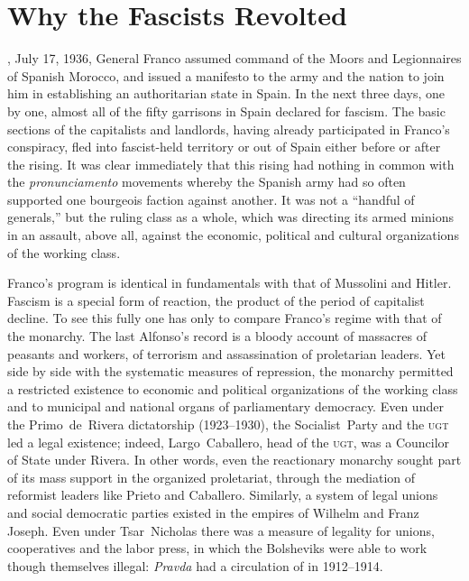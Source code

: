 \chapter{Why the Fascists Revolted}

, July 17, 1936, General Franco{\indexFFranco} assumed command of the Moors and Legionnaires of Spanish Morocco, and issued a manifesto to the army and the nation to join him in establishing an authoritarian state in Spain. In the next three days, one by one, almost all of the fifty garrisons in Spain declared for fascism. The basic sections of the capitalists and landlords, having already participated in Franco’s conspiracy, fled into fascist-held territory or out of Spain either before or after the rising. It was clear immediately that this rising had nothing in common with the \emph{pronunciamento} movements whereby the Spanish army had so often supported one bourgeois faction against another. It was not a ``handful of generals,'' but the ruling class as a whole, which was directing its armed minions in an assault, above all, against the economic, political and cultural organizations of the working class.

\indexFFranco{}
Franco’s program is identical in fundamentals with that of Mussolini and Hitler. Fascism is a special form of reaction, the product of the period of capitalist decline. To see this fully one has only to compare Franco’s regime with that of the monarchy. The last Alfonso’s record is a bloody account of massacres of peasants and workers, of terrorism and assassination of proletarian leaders. Yet side by side with the systematic measures of repression, the monarchy permitted a restricted existence to economic and political organizations of the working class and to municipal and national organs of parliamentary democracy. Even under the Primo~de~Rivera dictatorship (1923--1930), the Socialist~Party and the \textsc{ugt} led a legal existence; indeed, Largo~Caballero{\indexLCaballero}, head of the \textsc{ugt}, was a Councilor of State under Rivera.
\indexIPrieto{}
In other words, even the reactionary monarchy sought part of its mass support in the organized proletariat, through the mediation of reformist leaders like Prieto and Caballero. Similarly, a system of legal unions and social democratic parties existed in the empires of Wilhelm and Franz Joseph. Even under Tsar~Nicholas there was a measure of legality for unions, cooperatives and the labor press, in which the Bolsheviks were able to work though themselves illegal: \emph{Pravda} had a circulation of  in 1912--1914.

